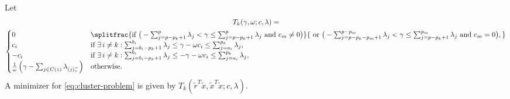 \begin{theorem}
  \label{thm:slope-thresholding}
  Let
  \begin{multline*}
    T_k(\gamma, \omega; c, \lambda) = \\
    \begin{cases}
      0                                                                         &
      \splitfrac{
        \text{if } \big(-\sum_{j = p - p_k + 1}^p \lambda_j < \gamma \leq \sum_{j = p - p_k + 1}^p \lambda_j
        \text{ and } c_m \neq 0\big)
      }{%
        \text{ or } \big(  -\sum_{j = p - p_k - p_m + 1}^{p - p_m} \lambda_j < \gamma \leq \sum_{j = p - p_k + 1}^{p_m} \lambda_j \text{ and } c_m = 0\big),
      }                                                                                                                                                                                                                    \\
      c_i                                                                       & \text{if } \exists\, i \neq k: \sum_{j = b_i - p_k + 1}^{b_i} \lambda_j \leq \gamma - \omega c_i \leq \sum_{j = a_i}^{p_k} \lambda_j,    \\
      -c_i                                                                      & \text{if } \exists\, i \neq k : \sum_{j = b_i - p_k + 1}^{b_i} \lambda_j \leq - \gamma - \omega c_i \leq \sum_{j = a_i}^{p_k} \lambda_j, \\
      \frac{1}{\omega}\left(\gamma - \sum_{j \in C(z)} \lambda_{(j)^-_z}\right) & \text{otherwise.}                                                                                                                        \\
    \end{cases}
  \end{multline*}
  A minimizer for \eqref{eq:cluster-problem} is given by \(T_k(\tilde{r}^T\tilde{x}, \tilde{x}^T\tilde{x}; c, \lambda)\).
\end{theorem}
